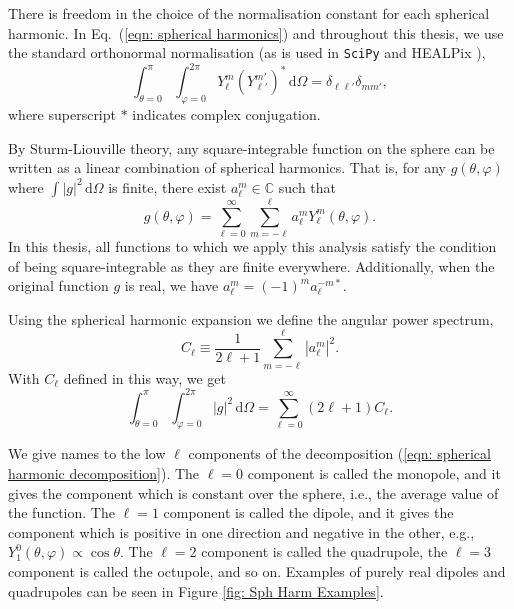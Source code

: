 \documentclass[a4paper,12pt]{report}
\newcommand{\diff}[1]{\,\text{d}{#1}}
\newcommand{\sphint}[1]{\int_{\theta=0}^\pi \int_{\varphi=0}^{2\pi} #1 \diff{\Omega}}
\renewcommand{\eqref}[1]{Eq.~({#1})}
\begin{document}
There is freedom in the choice of the normalisation constant for each spherical harmonic. In \eqref{\ref{eqn: spherical harmonics}} and throughout this thesis, we use the standard orthonormal normalisation (as is used in \texttt{SciPy} and HEALPix \cite{RN250}),
\begin{equation}\label{eqn: sph harm normalisation}
  \int_{\theta=0}^\pi \int_{\varphi=0}^{2\pi} Y^m_\ell (Y^{m'}_{\ell'})^* \diff{\Omega} = \delta_{\ell\ell'}\delta_{mm'},
\end{equation}
where superscript $*$ indicates complex conjugation.

By Sturm-Liouville theory, any square-integrable function on the sphere can be written as a linear combination of spherical harmonics. That is, for any $g(\theta,\varphi)$ where $\int |g|^2 \diff{\Omega}$ is finite, there exist $a^m_\ell \in \mathbb{C}$ such that
\begin{equation} \label{eqn: spherical harmonic decomposition}
  g(\theta,\varphi) = \sum_{\ell=0}^{\infty} \sum_{m=-\ell}^{\ell} a^m_\ell Y^m_\ell (\theta,\varphi).
\end{equation}
In this thesis, all functions to which we apply this analysis satisfy the condition of being square-integrable as they are finite everywhere. Additionally, when the original function $g$ is real, we have $a^m_\ell = (-1)^m{a^{-m*}_\ell}$.

Using the spherical harmonic expansion we define the angular power spectrum,
\begin{equation}\label{eqn: spherical harmonic power}
  C_\ell \equiv \frac{1}{2\ell+1}\sum_{m=-\ell}^{\ell} |a^m_\ell|^2.
\end{equation}
With $C_\ell$ defined in this way, we get
\begin{equation}
  \sphint{|g|^2}  = \sum_{\ell=0}^{\infty} (2\ell+1)C_\ell.
\end{equation}

We give names to the low $\ell$ components of the decomposition (\ref{eqn: spherical harmonic decomposition}). The $\ell=0$ component is called the monopole, and it gives the component which is constant over the sphere, i.e., the average value of the function. The $\ell=1$ component is called the dipole, and it gives the component which is positive in one direction and negative in the other, e.g., $Y^0_1 (\theta,\varphi) \propto \cos\theta$. The $\ell=2$ component is called the quadrupole, the $\ell=3$ component is called the octupole, and so on.
Examples of purely real dipoles and quadrupoles can be seen in Figure \ref{fig: Sph Harm Examples}.
\end{document}
